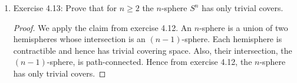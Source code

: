 \documentclass{article}
\begin{document}
\begin{enumerate}
  \item Exercise 4.13: Prove that for $n\geq2$ the $n$-sphere $S^n$ has
    only trivial covers.
    \begin{proof}
      We apply the claim from exercise 4.12. An $n$-sphere is a union of
      two hemispheres whose intersection is an $(n-1)$-sphere. Each
      hemisphere is contractible and hence has trivial covering space.
      Also, their intersection, the $(n-1)$-sphere, is path-connected.
      Hence from exercise 4.12, the $n$-sphere has only trivial covers.
    \end{proof}
\end{enumerate}
\end{document}
